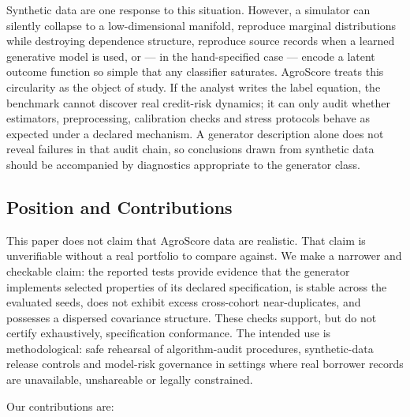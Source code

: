 \documentclass[journal]{IEEEtran}
\begin{document}
Synthetic data are one response to this situation. However, a simulator can silently collapse to a low-dimensional manifold, reproduce marginal distributions while destroying dependence structure, reproduce source records when a learned generative model is used, or --- in the hand-specified case --- encode a latent outcome function so simple that any classifier saturates. AgroScore treats this circularity as the object of study. If the analyst writes the label equation, the benchmark cannot discover real credit-risk dynamics; it can only audit whether estimators, preprocessing, calibration checks and stress protocols behave as expected under a declared mechanism. A generator description alone does not reveal failures in that audit chain, so conclusions drawn from synthetic data should be accompanied by diagnostics appropriate to the generator class.

\subsection{Position and Contributions}
This paper does not claim that AgroScore data are realistic. That claim is unverifiable without a real portfolio to compare against. We make a narrower and checkable claim: the reported tests provide evidence that the generator implements selected properties of its declared specification, is stable across the evaluated seeds, does not exhibit excess cross-cohort near-duplicates, and possesses a dispersed covariance structure. These checks support, but do not certify exhaustively, specification conformance. The intended use is methodological: safe rehearsal of algorithm-audit procedures, synthetic-data release controls and model-risk governance in settings where real borrower records are unavailable, unshareable or legally constrained.

Our contributions are:
\end{document}
